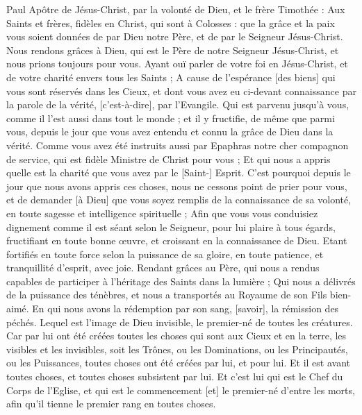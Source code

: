 \BFont
\begin{multicols}{2}
\VerseOne{}Paul Apôtre de Jésus-Christ, par la volonté de Dieu, et le frère Timothée :
Aux Saints et frères, fidèles en Christ, qui sont à Colosses : que la grâce et la paix vous soient données de par Dieu notre Père, et de par le Seigneur Jésus-Christ.
Nous rendons grâces à Dieu, qui est le Père de notre Seigneur Jésus-Christ, et nous prions toujours pour vous.
Ayant ouï parler de votre foi en Jésus-Christ, et de votre charité envers tous les Saints ;
A cause de l'espérance [des biens] qui vous sont réservés dans les Cieux, et dont vous avez eu ci-devant connaissance par la parole de la vérité, [c'est-à-dire], par l'Evangile.
Qui est parvenu jusqu'à vous, comme il l'est aussi dans tout le monde ; et il y fructifie, de même que parmi vous, depuis le jour que vous avez entendu et connu la grâce de Dieu dans la vérité.
Comme vous avez été instruits aussi par Epaphras notre cher compagnon de service, qui est fidèle Ministre de Christ pour vous ;
Et qui nous a appris quelle est la charité que vous avez par le [Saint-] Esprit.
C'est pourquoi depuis le jour que nous avons appris ces choses, nous ne cessons point de prier pour vous, et de demander [à Dieu] que vous soyez remplis de la connaissance de sa volonté, en toute sagesse et intelligence spirituelle ;
Afin que vous vous conduisiez dignement comme il est séant selon le Seigneur, pour lui plaire à tous égards, fructifiant en toute bonne œuvre, et croissant en la connaissance de Dieu.
Etant fortifiés en toute force selon la puissance de sa gloire, en toute patience, et tranquillité d'esprit, avec joie.
Rendant grâces au Père, qui nous a rendus capables de participer à l'héritage des Saints dans la lumière ;
Qui nous a délivrés de la puissance des ténèbres, et nous a transportés au Royaume de son Fils bien-aimé.
En qui nous avons la rédemption par son sang, [savoir], la rémission des péchés.
Lequel est l'image de Dieu invisible, le premier-né de toutes les créatures.
Car par lui ont été créées toutes les choses qui sont aux Cieux et en la terre, les visibles et les invisibles, soit les Trônes, ou les Dominations, ou les Principautés, ou les Puissances, toutes choses ont été créées par lui, et pour lui.
Et il est avant toutes choses, et toutes choses subsistent par lui.
Et c'est lui qui est le Chef du Corps de l'Eglise, et qui est le commencement [et] le premier-né d'entre les morts, afin qu'il tienne le premier rang en toutes choses.

\end{multicols}
